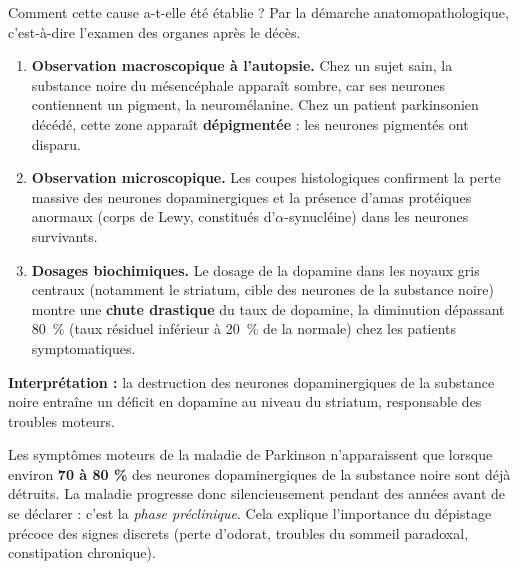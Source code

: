 \documentclass[11pt]{article}
\newcommand{\cle}[1]{{\popxbold\color{popdark}#1}}
\begin{document}
Comment cette cause a-t-elle été établie ? Par la démarche \cle{anatomopathologique}, c'est-à-dire l'examen des organes après le décès.

\begin{experience}
\begin{enumerate}
\item \textbf{Observation macroscopique à l'autopsie.} Chez un sujet sain, la substance noire du mésencéphale apparaît sombre, car ses neurones contiennent un pigment, la neuromélanine. Chez un patient parkinsonien décédé, cette zone apparaît \textbf{dépigmentée} : les neurones pigmentés ont disparu.
\item \textbf{Observation microscopique.} Les coupes histologiques confirment la perte massive des neurones dopaminergiques et la présence d'amas protéiques anormaux (corps de Lewy, constitués d'$\alpha$-synucléine) dans les neurones survivants.
\item \textbf{Dosages biochimiques.} Le dosage de la dopamine dans les noyaux gris centraux (notamment le striatum, cible des neurones de la substance noire) montre une \textbf{chute drastique} du taux de dopamine, la diminution dépassant \SI{80}{\%} (taux résiduel inférieur à \SI{20}{\%} de la normale) chez les patients symptomatiques.
\end{enumerate}
\textbf{Interprétation :} la destruction des neurones dopaminergiques de la substance noire entraîne un déficit en dopamine au niveau du striatum, responsable des troubles moteurs.
\end{experience}

\begin{exemplebox}
Les symptômes moteurs de la maladie de Parkinson n'apparaissent que lorsque environ \textbf{70 à 80 \%} des neurones dopaminergiques de la substance noire sont déjà détruits. La maladie progresse donc silencieusement pendant des années avant de se déclarer : c'est la \emph{phase préclinique}. Cela explique l'importance du dépistage précoce des signes discrets (perte d'odorat, troubles du sommeil paradoxal, constipation chronique).
\end{exemplebox}
\end{document}
